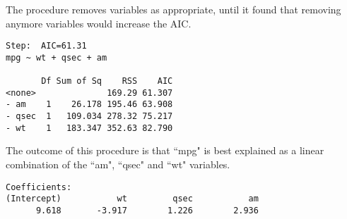 \documentclass[a4paper,12pt]{article}
\begin{document}
The procedure removes variables as appropriate, until it found that removing anymore variables would increase the AIC.
\begin{verbatim}
Step:  AIC=61.31
mpg ~ wt + qsec + am

       Df Sum of Sq    RSS    AIC
<none>              169.29 61.307
- am    1    26.178 195.46 63.908
- qsec  1   109.034 278.32 75.217
- wt    1   183.347 352.63 82.790
\end{verbatim}

The outcome of this procedure is that ``mpg" is best explained as a linear combination of the ``am", ``qsec" and ``wt" variables.

\begin{verbatim}
Coefficients:
(Intercept)           wt         qsec           am
      9.618       -3.917        1.226        2.936  
\end{verbatim}

\end{document}

